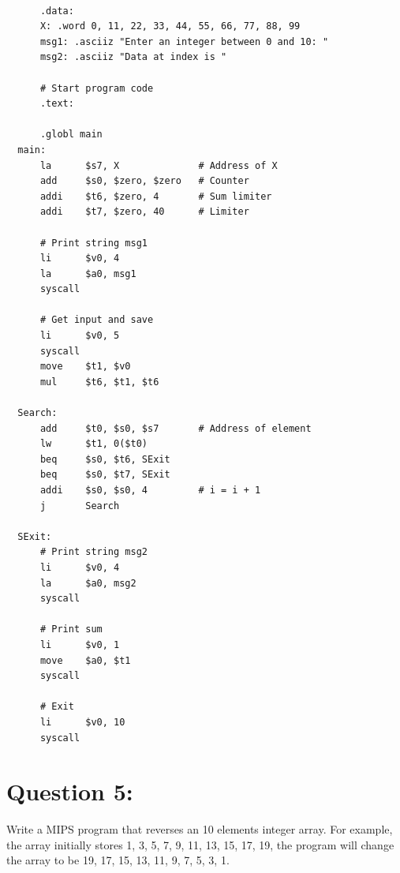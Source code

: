 \documentclass[12pt,a4paper]{article}
\begin{document}
\begin{mdframed}[hidealllines=true,backgroundcolor=magenta!10]
  \begin{lstlisting}

      .data:
      X: .word 0, 11, 22, 33, 44, 55, 66, 77, 88, 99
      msg1: .asciiz "Enter an integer between 0 and 10: "
      msg2: .asciiz "Data at index is "

      # Start program code
      .text:

      .globl main
  main:
      la      $s7, X              # Address of X
      add     $s0, $zero, $zero   # Counter
      addi    $t6, $zero, 4       # Sum limiter
      addi    $t7, $zero, 40      # Limiter

      # Print string msg1
      li      $v0, 4
      la      $a0, msg1
      syscall

      # Get input and save
      li      $v0, 5
      syscall
      move    $t1, $v0
      mul     $t6, $t1, $t6

  Search:
      add     $t0, $s0, $s7       # Address of element
      lw      $t1, 0($t0)
      beq     $s0, $t6, SExit
      beq     $s0, $t7, SExit
      addi    $s0, $s0, 4         # i = i + 1
      j       Search

  SExit:
      # Print string msg2
      li      $v0, 4
      la      $a0, msg2
      syscall

      # Print sum
      li      $v0, 1
      move    $a0, $t1
      syscall

      # Exit
      li      $v0, 10
      syscall

  \end{lstlisting}
\end{mdframed}


\section*{Question 5:}

Write a MIPS program that reverses an 10 elements integer array. For example, the array
initially stores 1, 3, 5, 7, 9, 11, 13, 15, 17, 19, the program will change the array to be 19, 17, 15, 13, 11, 9,
7, 5, 3, 1.
\end{document}
